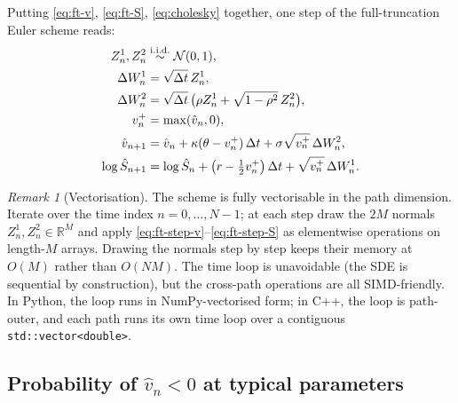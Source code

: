 \documentclass[11pt]{article}
\theoremstyle{plain}
\theoremstyle{definition}
\theoremstyle{remark}
\newtheorem{remark}[theorem]{Remark}
\begin{document}
Putting \eqref{eq:ft-v}, \eqref{eq:ft-S}, \eqref{eq:cholesky} together, one step of the full-truncation Euler scheme reads:
\begin{align}
    Z^1_n, Z^2_n &\stackrel{\mathrm{i.i.d.}}{\sim} \mathcal{N}(0, 1),                                \notag \\
    \Delta W^1_n &= \sqrt{\Delta t}\, Z^1_n,                                                       \notag \\
    \Delta W^2_n &= \sqrt{\Delta t}\, \bigl(\rho Z^1_n + \sqrt{1 - \rho^2}\, Z^2_n\bigr),         \notag \\
    v_n^+ &= \max(\hat v_n, 0),                                                                    \notag \\
    \hat v_{n+1} &= \hat v_n + \kappa(\theta - v_n^+)\,\Delta t + \sigma\sqrt{v_n^+}\,\Delta W^2_n,           \label{eq:ft-step-v}\\
    \log \hat S_{n+1} &= \log \hat S_n + \left(r - \tfrac12 v_n^+\right) \Delta t + \sqrt{v_n^+}\,\Delta W^1_n.                          \label{eq:ft-step-S}
\end{align}

\begin{remark}[Vectorisation]
The scheme is fully vectorisable in the path dimension. Iterate over the time index $n = 0, \ldots, N-1$; at each step draw the $2M$ normals $Z^1_n, Z^2_n \in \mathbb{R}^M$ and apply \eqref{eq:ft-step-v}--\eqref{eq:ft-step-S} as elementwise operations on length-$M$ arrays. Drawing the normals step by step keeps their memory at $O(M)$ rather than $O(NM)$. The time loop is unavoidable (the SDE is sequential by construction), but the cross-path operations are all SIMD-friendly. In Python, the loop runs in NumPy-vectorised form; in C++, the loop is path-outer, and each path runs its own time loop over a contiguous \texttt{std::vector<double>}.
\end{remark}

\subsection{Probability of $\hat v_n < 0$ at typical parameters}
\end{document}
